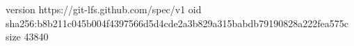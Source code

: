 version https://git-lfs.github.com/spec/v1
oid sha256:b8b211c045b004f4397566d5d4cde2a3b829a315babdb79190828a222fea575c
size 43840
